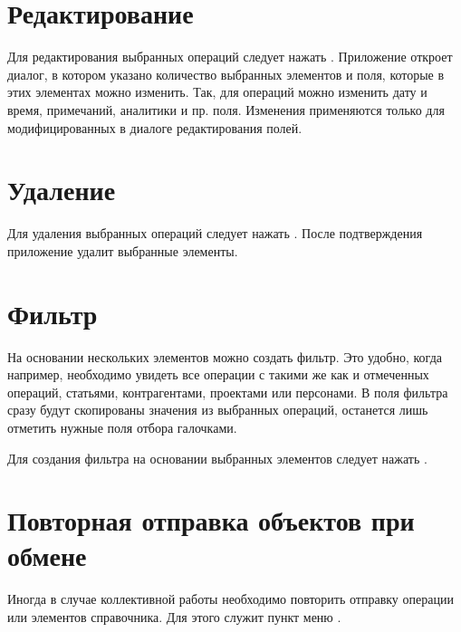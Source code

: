 \documentclass[a4paper,10pt,russian]{sphinxmanual}
\begin{document}
\section{Редактирование}
\label{\detokenize{bulk-actions:id3}}
Для редактирования выбранных операций следует нажать . Приложение откроет диалог, в котором
указано количество выбранных элементов и поля, которые в этих элементах можно изменить. Так, для операций можно изменить
дату и время, примечаний, аналитики и пр. поля. Изменения применяются только для модифицированных в диалоге редактирования
полей.

\noindent{}
\noindent{}


\section{Удаление}
\label{\detokenize{bulk-actions:id4}}
Для удаления выбранных операций следует нажать . После подтверждения приложение удалит выбранные элементы.

\noindent{}
\noindent{}


\section{Фильтр}
\label{\detokenize{bulk-actions:id5}}
На основании нескольких элементов можно создать фильтр. Это удобно, когда например, необходимо увидеть все операции с
такими же как и отмеченных операций, статьями, контрагентами, проектами или персонами. В поля фильтра сразу будут скопированы
значения из выбранных операций, останется лишь отметить нужные поля отбора галочками.

Для создания фильтра на основании выбранных элементов следует нажать .

\noindent{}
\noindent{}


\section{Повторная отправка объектов при обмене}
\label{\detokenize{bulk-actions:id6}}
Иногда в случае коллективной работы необходимо повторить отправку операции или элементов справочника. Для этого служит
пункт меню .
\end{document}
